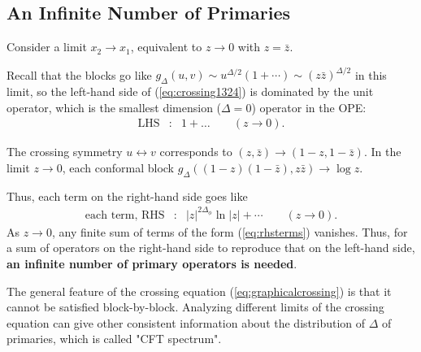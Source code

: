 \documentclass[12pt]{article}
\numberwithin{equation}{section}
\newcommand\be{\begin{eqnarray}}
\newcommand\ee{\end{eqnarray}}
\newcommand\f\phi
\newcommand\<\langle
\renewcommand\>\rangle
\newcommand\R{\mathbb{R}}
\renewcommand\.{\cdot}
\newcommand\x\times
\newcommand\De{\Delta}
\begin{document}
\subsection{An Infinite Number of Primaries}

Consider a limit $x_2\to x_1$, equivalent to $z\to 0$ with $z=\bar z$.

Recall that the blocks go like $g_{\De}(u,v) \sim u^{\De/2}(1+\cdots) \sim (z\bar z)^{\De/2}$ in this limit, so the left-hand side of (\ref{eq:crossing1324}) is dominated by the unit operator, which is the smallest dimension ($\De = 0$) operator in the OPE:
\be
\mathrm{LHS} &:& 1+\dots \qquad(z\to 0).
\ee

The crossing symmetry $u\leftrightarrow v$ corresponds to $(z,\bar z)\to (1-z,1-\bar z)$. 
In the limit $z\to 0$, each conformal block $g_{\De}((1-z)(1-\bar{z}),z\bar{z})\rightarrow\log z$.

Thus, each term on the right-hand side goes like
\be
\label{eq:rhsterms}
\textrm{each term, RHS} &:& |z|^{2\De_\f}\ln |z| + \cdots \qquad(z\to 0).
\ee
As $z\to 0$, any finite sum of terms of the form (\ref{eq:rhsterms}) vanishes.  Thus, for a sum of operators on the right-hand side to reproduce that on the left-hand side, {\bf an infinite number of primary operators is needed}.

The general feature of the crossing equation (\ref{eq:graphicalcrossing}) is that it cannot be satisfied block-by-block.
Analyzing different limits of the crossing equation can give other consistent information about the distribution of $\De$ of primaries, which is called "CFT spectrum".  
\end{document}
